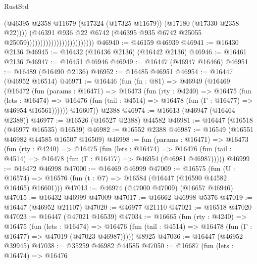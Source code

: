 \begin{lexlean}{RustStd}
\begin{coremodule}
                                                    (@46395
                                                      @2358
                                                      @11679
                                                      (@17324 (@17325 @11679))
                                                      (@17180 (@17330 @2358 @22))))
                                                  (@46391
                                                    @936
                                                    @22
                                                    @6742
                                                    (@46395
                                                      @935
                                                      @6742
                                                      @25055
                                                      @25059)))))))))))))))))))))))))
@46940 := @46159 @46939
@46941 := @16430 @2136
@46945 := @16432 (@16436 @2136) (@16442 @2136)
@46946 := @16461 @2136
@46947 := @16451 @46946
@46949 := @16447 (@46947 @16466)
@46951 := @16489 (@16490 @2136)
@46952 := @16485 @46951
@46954 := @16447 (@46952 @16514)
@46971 := @16446
    (fun (fn : @81) =>
    @46949
      (@16469
        (@16472
          (fun (params : @16471) =>
          @16473
            (fun (rty : @4240) =>
            @16475
              (fun (lets : @16474) =>
              @16476 (fun (tail : @4514) => @16478 (fun (Γ : @16477) => @46954 @16561))))))
        @16607))
    @2388
@46974 := @16613 (@46947 (@16464 @2388))
@46977 := @16526 (@16527 @2388) @44582
@46981 := @16447 (@16518 (@46977 @16535) @16539)
@46982 := @16552 @2388
@46987 := @16549 (@16551 @46982 @44585 @16507 @16509)
@46998 := fun (params : @16471) =>
  @16473
    (fun (rty : @4240) =>
    @16475
      (fun (lets : @16474) =>
      @16476 (fun (tail : @4514) => @16478 (fun (Γ : @16477) => @46954 (@46981 @46987)))))
@46999 := @16472 @46998
@47000 := @16469 @46999
@47009 := @16575
    (fun (U : @16574) => @16576 (fun (t : @7) => @16584 (@16447 (@16590 @44582 @16465) @16601)))
@47013 := @46974 (@47000 @47009) (@16657 @46946)
@47015 := @16432 @46999 @47009
@47017 := @16662 @46998 @5376
@47019 := @16447 (@46952 @21107)
@47020 := @46977 @21110
@47021 := @16518 @47020
@47023 := @16447 (@47021 @16539)
@47034 := @16665
    (fun (rty : @4240) =>
    @16475
      (fun (lets : @16474) =>
      @16476 (fun (tail : @4514) => @16478 (fun (Γ : @16477) => @47019 (@47023 @46987)))))
    @8925
@47036 := @16447 (@46952 @39945)
@47038 := @35259 @46982 @44585
@47050 := @16687
    (fun (lets : @16474) =>
    @16476

\end{coremodule}
\end{lexlean}
